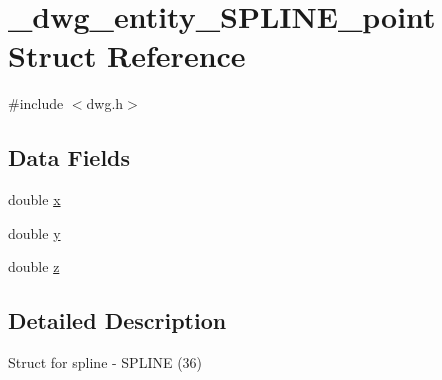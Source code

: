 \hypertarget{struct__dwg__entity__SPLINE__point}{\section{\-\_\-dwg\-\_\-entity\-\_\-\-S\-P\-L\-I\-N\-E\-\_\-point \-Struct \-Reference}
\label{struct__dwg__entity__SPLINE__point}
}


{\ttfamily \#include $<$dwg.\-h$>$}

\subsection*{\-Data \-Fields}
\begin{DoxyCompactItemize}
\item 
double \hyperlink{struct__dwg__entity__SPLINE__point_a212ee51be4b2b1e7818619308b48402b}{x}
\item 
double \hyperlink{struct__dwg__entity__SPLINE__point_ab78595e943ec135a453aeca105243c56}{y}
\item 
double \hyperlink{struct__dwg__entity__SPLINE__point_adf9becc86b3f49e972d2ae9efdd5c839}{z}
\end{DoxyCompactItemize}


\subsection{\-Detailed \-Description}
\-Struct for spline -\/ \-S\-P\-L\-I\-N\-E (36) 

